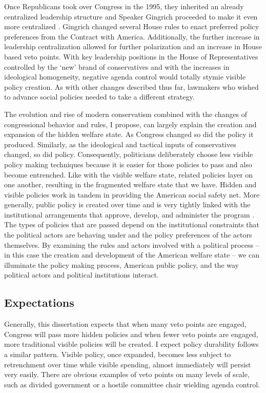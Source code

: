 \documentclass[12pt]{article}
\begin{document}
Once Republicans took over Congress in the 1995, they inherited an already centralized leadership structure and Speaker Gingrich proceeded to make it even more centralized \citep{roberts2003}. Gingrich changed several House rules to enact preferred policy preferences from the Contract with America. Additionally, the further increase in leadership centralization allowed for further polarization and an increase in House based veto points. With key leadership positions in the House of Representatives controlled by the `new' brand of conservatives and with the increases in ideological homogeneity, negative agenda control would totally stymie visible policy creation. As with other changes described thus far, lawmakers who wished to advance social policies needed to take a different strategy. 

The evolution and rise of modern conservatism combined with the changes of congressional behavior and rules, I propose, can largely explain the creation and expansion of the hidden welfare state. As Congress changed so did the policy it produced. Similarly, as the ideological and tactical inputs of conservatives changed, so did policy. Consequently, politicians deliberately choose less visible policy making techniques because it is easier for those policies to pass and also become entrenched. Like with the visible welfare state, related policies layer on one another, resulting in the fragmented welfare state that we have. Hidden and visible policies work in tandem in providing the American social safety net. More generally, public policy is created over time and is very tightly linked with the institutional arrangements that approve, develop, and administer the program \citep{pierson2004b}. The types of policies that are passed depend on the institutional constraints that the political actors are behaving under and the policy preferences of the actors themselves. By examining the rules and actors involved with a political process -- in this case the creation and development of the American welfare state -- we can illuminate the policy making process, American public policy, and the way political actors and political institutions interact.

\subsection{Expectations}
Generally, this dissertation expects that when many veto points are engaged, Congress will pass more hidden policies and when fewer veto points are engaged, more traditional visible policies will be created. I expect policy durability follows a similar pattern. Visible policy, once expanded, becomes less subject to retrenchment over time while visible spending, almost immediately will persist very easily. There are obvious examples of veto points on many levels of scale, such as divided government or a hostile committee chair wielding agenda control. 
\end{document}
